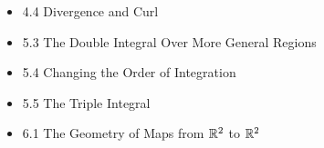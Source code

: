 \documentclass[11pt]{article}
\begin{document}
\begin{itemize}
  \item 4.4 Divergence and Curl
  \item 5.3 The Double Integral Over More General Regions
  \item 5.4 Changing the Order of Integration
  \item 5.5 The Triple Integral
  \item 6.1 The Geometry of Maps from \(\mathbb R^2\) to \(\mathbb R^2\)



\end{itemize}
\end{document}
